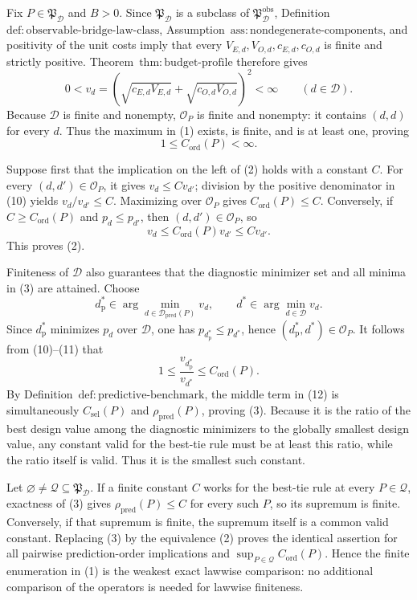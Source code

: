 Fix \(P\in\mathfrak P_{\mathcal D}\) and \(B>0\).  Since \(\mathfrak P_{\mathcal D}\) is a subclass of \(\mathfrak P_{\mathcal D}^{\mathrm{obs}}\), Definition~\(\mathrm{def{:}observable\text{-}bridge\text{-}law\text{-}class}\), Assumption~\(\mathrm{ass{:}nondegenerate\text{-}components}\), and positivity of the unit costs imply that every \(V_{E,d},V_{O,d},c_{E,d},c_{O,d}\) is finite and strictly positive.  Theorem~\(\mathrm{thm{:}budget\text{-}profile}\) therefore gives
\[
 0<v_d
 =\left(\sqrt{c_{E,d}V_{E,d}}+
          \sqrt{c_{O,d}V_{O,d}}\right)^2
 <\infty
 \qquad(d\in\mathcal D).                                      \tag{10}
\]
Because \(\mathcal D\) is finite and nonempty, \(\mathcal O_P\) is finite and nonempty: it contains \((d,d)\) for every \(d\).  Thus the maximum in (1) exists, is finite, and is at least one, proving
\[
 1\le C_{\mathrm{ord}}(P)<\infty.                             \tag{11}
\]

Suppose first that the implication on the left of (2) holds with a constant \(C\).  For every \((d,d')\in\mathcal O_P\), it gives \(v_d\le Cv_{d'}\); division by the positive denominator in (10) yields \(v_d/v_{d'}\le C\).  Maximizing over \(\mathcal O_P\) gives \(C_{\mathrm{ord}}(P)\le C\).  Conversely, if \(C\ge C_{\mathrm{ord}}(P)\) and \(p_d\le p_{d'}\), then \((d,d')\in\mathcal O_P\), so
\[
 v_d\le C_{\mathrm{ord}}(P)v_{d'}\le Cv_{d'}.
\]
This proves (2).

Finiteness of \(\mathcal D\) also guarantees that the diagnostic minimizer set and all minima in (3) are attained.  Choose
\[
 d_{\mathrm p}^*\in
 \arg\min_{d\in\mathcal D_{\mathrm{pred}}(P)}v_d,
 \qquad
 d^*\in\arg\min_{d\in\mathcal D}v_d.
\]
Since \(d_{\mathrm p}^*\) minimizes \(p_d\) over \(\mathcal D\), one has \(p_{d_{\mathrm p}^*}\le p_{d^*}\), hence \((d_{\mathrm p}^*,d^*)\in\mathcal O_P\).  It follows from (10)--(11) that
\[
 1\le
 \frac{v_{d_{\mathrm p}^*}}{v_{d^*}}
 \le C_{\mathrm{ord}}(P).                                    \tag{12}
\]
By Definition~\(\mathrm{def{:}predictive\text{-}benchmark}\), the middle term in (12) is simultaneously \(C_{\mathrm{sel}}(P)\) and \(\rho_{\mathrm{pred}}(P)\), proving (3).  Because it is the ratio of the best design value among the diagnostic minimizers to the globally smallest design value, any constant valid for the best-tie rule must be at least this ratio, while the ratio itself is valid.  Thus it is the smallest such constant.

Let \(\varnothing\ne\mathcal Q\subseteq\mathfrak P_{\mathcal D}\).  If a finite constant \(C\) works for the best-tie rule at every \(P\in\mathcal Q\), exactness of (3) gives \(\rho_{\mathrm{pred}}(P)\le C\) for every such \(P\), so its supremum is finite.  Conversely, if that supremum is finite, the supremum itself is a common valid constant.  Replacing (3) by the equivalence (2) proves the identical assertion for all pairwise prediction-order implications and \(\sup_{P\in\mathcal Q}C_{\mathrm{ord}}(P)\).  Hence the finite enumeration in (1) is the weakest exact lawwise comparison: no additional comparison of the operators is needed for lawwise finiteness.

